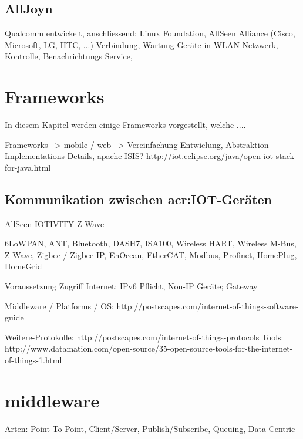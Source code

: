 \subsection{AllJoyn}
Qualcomm entwickelt, anschliessend: Linux Foundation, AllSeen Alliance (Cisco, Microsoft, LG, HTC, ...)
Verbindung, Wartung Geräte in WLAN-Netzwerk, Kontrolle, Benachrichtungs Service, 

\section{Frameworks}
In diesem Kapitel werden einige Frameworks vorgestellt, welche ....

Frameworks --> mobile / web --> Vereinfachung Entwiclung, Abstraktion Implementations-Details, 
apache ISIS?
http://iot.eclipse.org/java/open-iot-stack-for-java.html

\subsection{Kommunikation zwischen \gls{acr:IOT}-Geräten}
AllSeen
IOTIVITY
Z-Wave






6LoWPAN, ANT, Bluetooth, DASH7, ISA100, Wireless HART, Wireless M-Bus, Z-Wave, Zigbee / Zigbee IP, EnOcean, EtherCAT, Modbus, Profinet, HomePlug, HomeGrid


Voraussetzung Zugriff Internet: IPv6 Pflicht, Non-IP Geräte; Gateway


Middleware / Platforms / OS: http://postscapes.com/internet-of-things-software-guide

Weitere-Protokolle: http://postscapes.com/internet-of-things-protocols
Tools: http://www.datamation.com/open-source/35-open-source-tools-for-the-internet-of-things-1.html

\section{middleware}
Arten: Point-To-Point, Client/Server, Publish/Subscribe, Queuing, Data-Centric